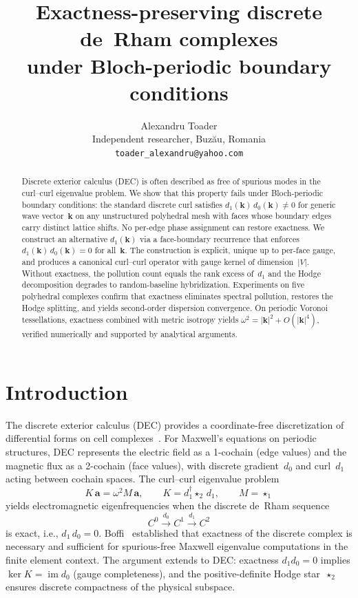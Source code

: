 \documentclass[12pt]{article}
\title{Exactness-preserving discrete de~Rham complexes\\
under Bloch-periodic boundary conditions}
\author{Alexandru Toader\\
Independent researcher, Buz\u{a}u, Romania\\
\texttt{toader\_alexandru@yahoo.com}}
\date{}
\theoremstyle{definition}
\theoremstyle{remark}
\newcommand{\kk}{\mathbf{k}}
\DeclareMathOperator{\im}{im}
\DeclareMathOperator{\cker}{ker}
\begin{document}
\maketitle

\begin{abstract}
Discrete exterior calculus (DEC) is often described as free of spurious
modes in the curl--curl eigenvalue problem. We show that this property fails
under Bloch-periodic boundary conditions: the standard discrete curl satisfies
$d_1(\kk)\,d_0(\kk) \neq 0$ for generic wave vector~$\kk$ on any unstructured
polyhedral mesh with faces whose boundary edges carry distinct lattice shifts.
No per-edge phase assignment can restore exactness. We construct an alternative
$d_1(\kk)$ via a face-boundary recurrence that enforces
$d_1(\kk)\,d_0(\kk) = 0$ for all~$\kk$. The construction is explicit, unique
up to per-face gauge, and produces a canonical curl--curl operator with gauge
kernel of dimension~$|V|$. Without exactness, the pollution count equals the
rank excess of~$d_1$ and the Hodge decomposition degrades to random-baseline
hybridization. Experiments on five polyhedral complexes confirm that exactness
eliminates spectral pollution, restores the Hodge splitting, and yields
second-order dispersion convergence. On periodic Voronoi tessellations,
exactness combined with metric isotropy yields
$\omega^2 = |\kk|^2 + O(|\kk|^4)$, verified numerically and supported
by analytical arguments.
\end{abstract}

\section{Introduction}
\label{sec:intro}

The discrete exterior calculus (DEC) provides a coordinate-free discretization
of differential forms on cell complexes~\cite{Hirani2003,Desbrun2005}. For
Maxwell's equations on periodic structures, DEC represents the electric field
as a 1-cochain (edge values) and the magnetic flux as a 2-cochain (face values),
with discrete gradient~$d_0$ and curl~$d_1$ acting between cochain spaces. The
curl--curl eigenvalue problem
\begin{equation}\label{eq:curlcurl}
  K\,\mathbf{a} = \omega^2 M\,\mathbf{a}, \qquad
  K = d_1^\dagger \star_2\, d_1, \qquad M = \star_1
\end{equation}
yields electromagnetic eigenfrequencies when the discrete de~Rham sequence
\begin{equation}\label{eq:derham}
  C^0 \xrightarrow{d_0} C^1 \xrightarrow{d_1} C^2
\end{equation}
is exact, i.e., $d_1\,d_0 = 0$. Boffi~\cite{Boffi2010} established that
exactness of the discrete complex is necessary and sufficient for spurious-free
Maxwell eigenvalue computations in the finite element context. The argument
extends to DEC: exactness $d_1 d_0 = 0$ implies $\cker K = \im d_0$ (gauge
completeness), and the positive-definite Hodge star~$\star_2$ ensures discrete
compactness of the physical subspace.
\end{document}
